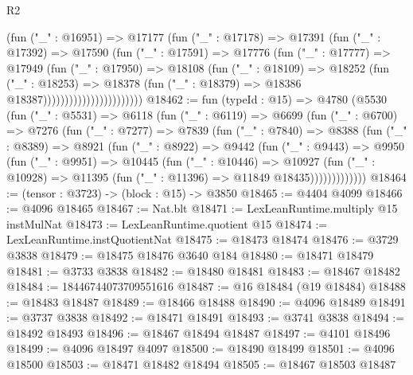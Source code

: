 \begin{lexlean}{R2}
\begin{coremodule}
                                (fun ("_" : @16951) =>
                                @17177
                                  (fun ("_" : @17178) =>
                                  @17391
                                    (fun ("_" : @17392) =>
                                    @17590
                                      (fun ("_" : @17591) =>
                                      @17776
                                        (fun ("_" : @17777) =>
                                        @17949
                                          (fun ("_" : @17950) =>
                                          @18108
                                            (fun ("_" : @18109) =>
                                            @18252
                                              (fun ("_" : @18253) =>
                                              @18378
                                                (fun ("_" : @18379) =>
                                                @18386 @18387)))))))))))))))))))))))
@18462 := fun (typeId : @15) =>
  @4780
    (@5530
      (fun ("_" : @5531) =>
      @6118
        (fun ("_" : @6119) =>
        @6699
          (fun ("_" : @6700) =>
          @7276
            (fun ("_" : @7277) =>
            @7839
              (fun ("_" : @7840) =>
              @8388
                (fun ("_" : @8389) =>
                @8921
                  (fun ("_" : @8922) =>
                  @9442
                    (fun ("_" : @9443) =>
                    @9950
                      (fun ("_" : @9951) =>
                      @10445
                        (fun ("_" : @10446) =>
                        @10927
                          (fun ("_" : @10928) =>
                          @11395 (fun ("_" : @11396) => @11849 @18435)))))))))))))
@18464 := (tensor : @3723) -> (block : @15) -> @3850
@18465 := @4404 @4099
@18466 := @4096 @18465
@18467 := Nat.blt
@18471 := LexLeanRuntime.multiply @15 instMulNat
@18473 := LexLeanRuntime.quotient @15
@18474 := LexLeanRuntime.instQuotientNat
@18475 := @18473 @18474
@18476 := @3729 @3838
@18479 := @18475 @18476 @3640 @184
@18480 := @18471 @18479
@18481 := @3733 @3838
@18482 := @18480 @18481
@18483 := @18467 @18482
@18484 := 18446744073709551616
@18487 := @16 @18484 (@19 @18484)
@18488 := @18483 @18487
@18489 := @18466 @18488
@18490 := @4096 @18489
@18491 := @3737 @3838
@18492 := @18471 @18491
@18493 := @3741 @3838
@18494 := @18492 @18493
@18496 := @18467 @18494 @18487
@18497 := @4101 @18496
@18499 := @4096 @18497 @4097
@18500 := @18490 @18499
@18501 := @4096 @18500
@18503 := @18471 @18482 @18494
@18505 := @18467 @18503 @18487

\end{coremodule}
\end{lexlean}
